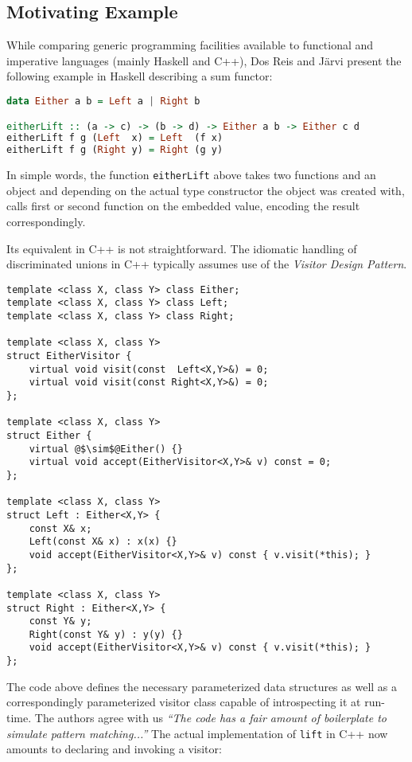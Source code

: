 \documentclass[preprint]{sigplanconf}
\DeclareRobustCommand{\codehaskell}[1]{{\lstinline[breaklines=false,language=Haskell]{#1}}}
\begin{document}
\subsection{Motivating Example}
\label{sec:xmpl}

While comparing generic programming facilities available to functional and 
imperative languages (mainly Haskell and C++), Dos Reis and J\"arvi present the 
following example in Haskell describing a sum functor\cite{DRJ05}:

\begin{lstlisting}[language=Haskell]
data Either a b = Left a | Right b

eitherLift :: (a -> c) -> (b -> d) -> Either a b -> Either c d
eitherLift f g (Left  x) = Left  (f x)
eitherLift f g (Right y) = Right (g y)
\end{lstlisting}

In simple words, the function \codehaskell{eitherLift} above takes two functions and an 
object and depending on the actual type constructor the object was created with, 
calls first or second function on the embedded value, encoding the result 
correspondingly.

Its equivalent in C++ is not straightforward. The idiomatic handling of 
discriminated unions in C++ typically assumes use of the \emph{Visitor Design 
Pattern}\cite{DesignPatterns1993}.

\begin{lstlisting}
template <class X, class Y> class Either;
template <class X, class Y> class Left;
template <class X, class Y> class Right;

template <class X, class Y>
struct EitherVisitor {
    virtual void visit(const  Left<X,Y>&) = 0;
    virtual void visit(const Right<X,Y>&) = 0;
};

template <class X, class Y>
struct Either {
    virtual @$\sim$@Either() {}
    virtual void accept(EitherVisitor<X,Y>& v) const = 0;
};

template <class X, class Y>
struct Left : Either<X,Y> {
    const X& x;
    Left(const X& x) : x(x) {}
    void accept(EitherVisitor<X,Y>& v) const { v.visit(*this); }
};

template <class X, class Y>
struct Right : Either<X,Y> {
    const Y& y;
    Right(const Y& y) : y(y) {}
    void accept(EitherVisitor<X,Y>& v) const { v.visit(*this); }
};
\end{lstlisting}

The code above defines the necessary parameterized data structures as well as a 
correspondingly parameterized visitor class capable of introspecting it at 
run-time. The authors agree with us \emph{``The code has a fair amount of 
boilerplate to simulate pattern matching...''}\cite{DRJ05} The actual 
implementation of \codehaskell{lift} in C++ now amounts to declaring and 
invoking a visitor:
\end{document}
